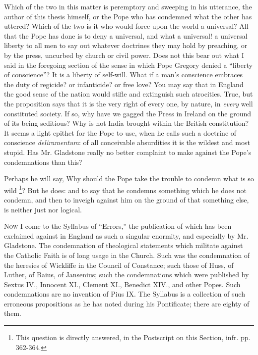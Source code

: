Which of the two in this matter is peremptory and sweeping in his
utterance, the author of this thesis himself, or the Pope who has
condemned what the other has uttered? Which of the two is it who would
force upon the world a universal? All that the Pope has done is to deny
a universal, and what a universal! a universal liberty to all men to say
out whatever doctrines they may hold by preaching, or by the press,
uncurbed by church or civil power. Does not this bear out what I said in
the foregoing section of the sense in which Pope Gregory denied a
``liberty of conscience''? It is a liberty of self-will. What if
a man's conscience embraces the duty of regicide? or infanticide? or
free love? You may say that in England the good sense of the nation
would stifle and extinguish such atrocities. True, but the proposition
says that it is the very right of every one, by nature, in \emph{every}
well constituted society. If so, why have we gagged the Press in Ireland
on the ground of its being seditious? Why is not India brought within
the British constitution? It seems a light epithet for the Pope to use,
when he calls such a doctrine of conscience \emph{deliramentum}: of all
conceivable absurdities it is the wildest and most stupid. Has Mr.
Gladstone really no better complaint to make against the Pope's
condemnations than this?

Perhaps he will say, Why should the Pope take the trouble to condemn
what is so wild \footnote{This question is directly answered, in the
Postscript on this Section, infr. pp. 362-364.}? But he
does: and to say that he condemns something which he does not condemn,
and then to inveigh against him on the ground of that something else, is
neither just nor logical.


N\textsc{ow} I come to the Syllabus of ``Errors,'' the
publication of which has been exclaimed against in England as such a
singular enormity, and especially by Mr. Gladstone. The condemnation of
theological statements which militate against the Catholic Faith is of
long usage in the Church. Such was the condemnation of the heresies of
Wickliffe in the Council of Constance; such those of Huss, of Luther, of
Baius, of Jansenius; such the condemnations which were published by
Sextus IV., Innocent XI., Clement XI., Benedict XIV., and other Popes.
Such condemnations are no invention of Pius IX. The Syllabus is a
collection of such erroneous propositions as he has noted during his
Pontificate; there are eighty of them.

